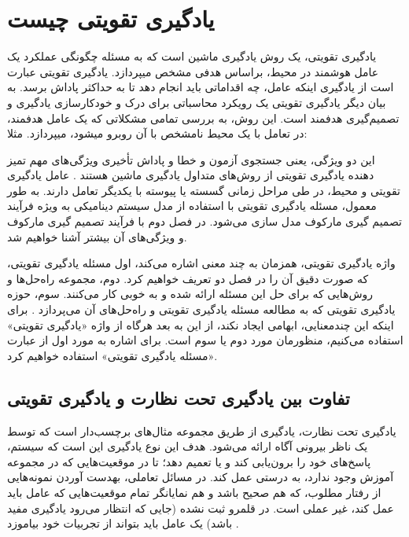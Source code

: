 \section{یادگیری تقویتی چیست}
یادگیری تقویتی، یک روش یادگیری ماشین است که  به مسئله چگونگی عملکرد یک عامل هوشمند  در محیط، براساس هدفی مشخص می\nf پردازد. یادگیری تقویتی عبارت است از یادگیری اینکه عامل، چه اقداماتی باید انجام دهد تا به حداکثر پاداش برسد. به بیان دیگر یادگیری تقویتی یک رویکرد محاسباتی برای درک و خودکار\nf سازی یادگیری و تصمیم‌گیری هدفمند است. این روش، به بررسی تمامی‌ مشکلاتی که یک عامل هدفمند، در تعامل با یک محیط نامشخص با آن روبرو می\nf شود، می\nf پردازد. مثلا:



 
 

این دو ویژگی،  یعنی جستجوی آزمون و خطا و پاداش تأخیری ویژگی‌های مهم تمیز دهنده یادگیری تقویتی از روش‌های متداول یادگیری ماشین هستند \cite{suttonbook}.
 عامل یادگیری تقویتی و محیط، در طی مراحل زمانی گسسته یا پیوسته با یکدیگر تعامل دارند. به طور معمول، مسئله یادگیری تقویتی با استفاده از مدل سیستم دینامیکی به ویژه فرآیند تصمیم گیری مارکوف مدل سازی می‌شود. در فصل دوم با فرآیند تصمیم گیری مارکوف و ویژگی‌های آن بیشتر آشنا خواهیم شد.

واژه یادگیری تقویتی، همزمان به چند معنی اشاره می‌کند، اول مسئله یادگیری تقویتی، که صورت دقیق آن را در فصل دو تعریف خواهیم کرد. دوم، مجموعه راه‌حل‌ها و روش‌هایی که برای حل این مسئله ارائه شده و به خوبی کار می‌کنند. سوم، حوزه یادگیری تقویتی که به مطالعه مسئله یادگیری تقویتی و راه‌حل‌های آن می‌پردازد
\cite{suttonbook}.
 برای اینکه این چندمعنایی، ابهامی ایجاد نکند، از این به بعد هرگاه از واژه «یادگیری تقویتی» استفاده می‌کنیم، منظورمان  مورد دوم یا سوم است. برای اشاره به مورد اول از عبارت «مسئله یادگیری تقویتی» استفاده خواهیم کرد. 



\subsection*{تفاوت بین یادگیری تحت نظارت و یادگیری تقویتی}
یادگیری تحت نظارت، یادگیری از طریق مجموعه مثال‌های برچسب‌دار است که توسط یک ناظر بیرونی آگاه ارائه می‌شود. هدف این نوع یادگیری این است که سیستم، پاسخ‌های خود را برون‌یابی کند و یا تعمیم دهد؛ تا در موقعیت‌هایی که در مجموعه آموزش وجود ندارد، به درستی عمل کند. در مسائل تعاملی، به\nf دست آوردن نمونه‌هایی از رفتار مطلوب، که هم صحیح باشد و هم نمایانگر تمام موقعیت‌هایی که عامل باید عمل کند، غیر عملی است. در قلمرو ثبت نشده (جایی که انتظار می‌رود یادگیری مفید باشد) یک عامل باید بتواند از تجربیات خود بیاموزد
\cite{suttonbook}.

